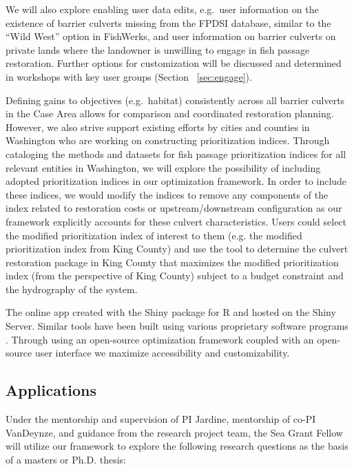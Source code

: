 \documentclass[12pt]{elsarticle}
\begin{document}
We will also explore enabling user data edits, e.g.\ user information on the existence of barrier culverts missing from the FPDSI database, similar to the ``Wild West'' option in FishWerks, and user information on barrier culverts on private lands where the landowner is unwilling to engage in fish passage restoration. Further options for customization will be discussed and determined in workshops with key user groups (Section ~\ref{sec:engage}).

Defining gains to objectives (e.g.\ habitat) consistently across all barrier culverts in the Case Area allows for comparison and coordinated restoration planning. However, we also strive support existing efforts by cities and counties in Washington who are working on constructing prioritization indices. Through cataloging the methods and datasets for fish passage prioritization indices for all relevant entities in Washington, we will explore the possibility of including adopted prioritization indices in our optimization framework. In order to include these indices, we would modify the indices to remove any components of the index related to restoration costs or upstream/downstream configuration as our framework explicitly accounts for these culvert characteristics. Users could select the modified prioritization index of interest to them (e.g. the modified prioritization index from King County) and use the tool to determine the culvert restoration package in King County that maximizes the modified prioritization index (from the perspective of King County) subject to a budget constraint and the hydrography of the system.
  
The online app created with the Shiny package for R and hosted on the Shiny Server. Similar tools have been built using various proprietary software programs \citep{ohanley_optipass_2015, moody_pet_2017, mcmanamay_commonalities_2019}. Through using an open-source optimization framework coupled with an open-source user interface we maximize accessibility and customizability. 


\subsection*{Applications}

Under the mentorship and supervision of PI Jardine, mentorship of co-PI VanDeynze, and guidance from the research project team, the Sea Grant Fellow will utilize our framework to explore the following research questions as the basis of a masters or Ph.D. thesis: 
\end{document}
